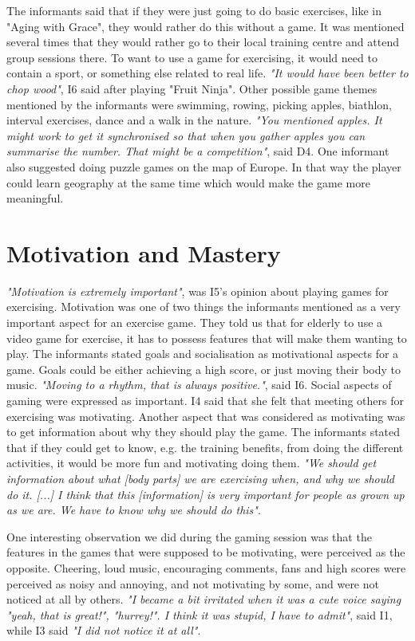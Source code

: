 The informants said that if they were just going to do basic exercises, like in "Aging with Grace", they would rather do this without a game. It was mentioned several times that they would rather go to their local training centre and attend group sessions there. To want to use a game for exercising, it would need to contain a sport, or something else related to real life. \emph{"It would have been better to chop wood"}, I6 said after playing "Fruit Ninja". Other possible game themes mentioned by the informants were swimming, rowing, picking apples, biathlon, interval exercises, dance and a walk in the nature. \emph{"You mentioned apples. It might work to get it synchronised so that when you gather apples you can summarise the number. That might be a competition"}, said D4. One informant also suggested doing puzzle games on the map of Europe. In that way the player could learn geography at the same time which would make the game more meaningful.

\section{Motivation and Mastery}

\emph{"Motivation is extremely important"}, was I5's opinion about playing games for exercising. Motivation was one of two things the informants mentioned as a very important aspect for an exercise game. They told us that for elderly to use a video game for exercise, it has to possess features that will make them wanting to play. The informants stated goals and socialisation as motivational aspects for a game. Goals could be either achieving a high score, or just moving their body to music.  \emph{"Moving to a rhythm, that is always positive."}, said I6. Social aspects of gaming were expressed as important. I4 said that she felt that meeting others for exercising was motivating.   Another aspect that was considered as motivating was to get information about why they should play the game. The informants stated that if they could get to know, e.g. the training benefits, from doing the different activities, it would be more fun and motivating doing them. \emph{"We should get information about what [body parts] we are exercising when, and why we should do it. [...] I think that this [information] is very important for people as grown up as we are. We have to know why we should do this"}. 

One interesting observation we did during the gaming session was that the features in the games that were supposed to be motivating, were perceived as the opposite. Cheering, loud music, encouraging comments, fans and high scores were perceived as noisy and annoying, and not motivating by some, and were not noticed at all by others. \emph{"I became a bit irritated when it was a cute voice saying "yeah, that is great!", "hurrey!". I think it was stupid, I have to admit"}, said I1, while I3 said \emph{"I did not notice it at all"}. 

